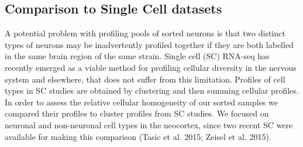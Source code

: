 \subsection{Comparison to Single Cell datasets}
A potential problem with profiling pools of sorted neurons is that two distinct types of neurons may be inadvertently profiled together if they are both labelled in the same brain region of the same strain. Single cell (SC) RNA-seq has recently emerged as a viable method for profiling cellular diversity in the nervous system and elsewhere, that does not suffer from this limitation. Profiles of cell types in SC studies are obtained by clustering and then summing cellular profiles. In order to assess the relative cellular homogeneity of our sorted samples we compared their profiles to cluster profiles from SC studies. We focused on neuronal and non-neuronal cell types in the neocortex, since two recent SC were available for making this comparison (Tasic et al. 2015; Zeisel et al. 2015).    